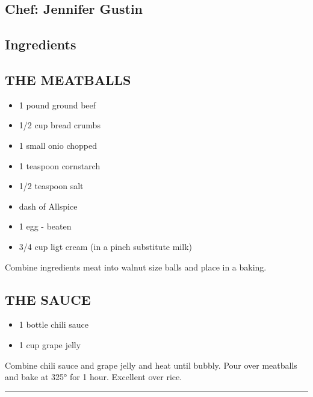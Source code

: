 \documentclass[
]{book}
\providecommand{\tightlist}{%
  \setlength{\itemsep}{0pt}\setlength{\parskip}{0pt}}
\begin{document}
\hypertarget{chef-jennifer-gustin-9}{%
\subsection*{Chef: Jennifer Gustin}\label{chef-jennifer-gustin-9}}


\hypertarget{ingredients-62}{%
\subsection*{Ingredients}\label{ingredients-62}}


\hypertarget{the-meatballs}{%
\subsection*{THE MEATBALLS}\label{the-meatballs}}


\begin{itemize}
\tightlist
\item
  1 pound ground beef
\item
  1/2 cup bread crumbs
\item
  1 small onio chopped
\item
  1 teaspoon cornstarch
\item
  1/2 teaspoon salt
\item
  dash of Allspice
\item
  1 egg - beaten
\item
  3/4 cup ligt cream (in a pinch substitute milk)
\end{itemize}

Combine ingredients meat into walnut size balls and place in a baking.

\hypertarget{the-sauce-1}{%
\subsection*{THE SAUCE}\label{the-sauce-1}}


\begin{itemize}
\tightlist
\item
  1 bottle chili sauce
\item
  1 cup grape jelly
\end{itemize}

Combine chili sauce and grape jelly and heat until bubbly. Pour over meatballs and bake at 325° for 1 hour.
Excellent over rice.

\begin{center}\rule{0.5\linewidth}{0.5pt}\end{center}
\end{document}
